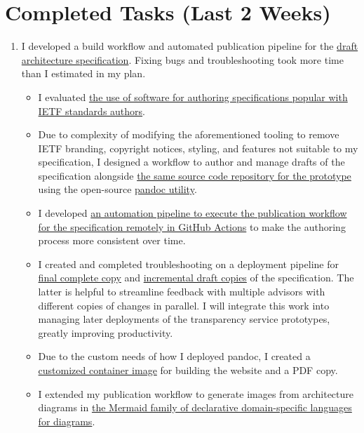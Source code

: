 \documentclass{jdf}
\begin{document}
\section*{Completed Tasks (Last 2 Weeks)}

\begin{enumerate}
    \item I developed a build workflow and automated publication pipeline for the \hyperlink{https://add-architecture-draft--conmotion.netlify.app/architecture.html}{draft architecture specification}. Fixing bugs and troubleshooting took more time than I estimated in my plan.
        \begin{itemize}
            \item I evaluated \hyperlink{https://github.com/martinthomson/i-d-template}{the use of software for authoring specifications popular with IETF standards authors}.
            \item Due to complexity of modifying the aforementioned tooling to remove IETF branding, copyright notices, styling, and features not suitable to my specification, I designed a workflow to author and manage drafts of the specification alongside \hyperlink{https://github.com/aj-stein/conmotion/}{the same source code repository for the prototype} using the open-source \hyperlink{https://pandoc.org/}{pandoc utility}.
            \item I developed \hyperlink{https://github.com/aj-stein/conmotion/blob/develop/.github/workflows/cd.yml}{an automation pipeline to execute the publication workflow for the specification remotely in GitHub Actions} to make the authoring process more consistent over time.
            \item I created and completed troubleshooting on a deployment pipeline for \hyperlink{https://aj-stein.github.io/conmotion/}{final complete copy} and \hyperlink{https://conmotion.netlify.app/}{incremental draft copies} of the specification. The latter is helpful to streamline feedback with multiple advisors with different copies of changes in parallel. I will integrate this work into managing later deployments of the transparency service prototypes, greatly improving productivity. 
            \item Due to the custom needs of how I deployed pandoc, I created a \hyperlink{https://github.com/users/aj-stein/packages/container/package/pandoc\%2Flatex}{customized container image} for building the website and a PDF copy.
            \item I extended my publication workflow to generate images from architecture diagrams in \hyperlink{https://mermaid.js.org/}{the Mermaid family of declarative domain-specific languages for diagrams}.

\end{itemize}
\end{enumerate}
\end{document}

